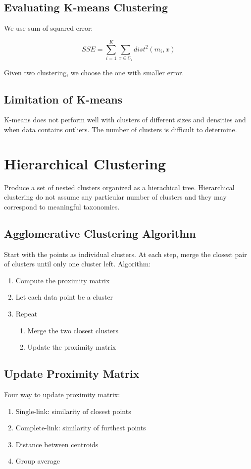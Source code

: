 \begin{multicols*}{2}
\subsection{Evaluating K-means Clustering}

\noindent We use sum of squared error:

$$SSE=\sum_{i=1}^K \sum_{x \in C_i} dist^2 (m_i,x)$$

\noindent Given two clustering, we choose the one with smaller error.

\subsection{Limitation of K-means}

K-means does not perform well with clusters of different sizes and densities and when data contains outliers. The number of clusters is difficult to determine. 

\section{Hierarchical Clustering}

\noindent Produce a set of nested clusters organized as a hierachical tree. Hierarchical clustering do not assume any particular number of clusters and they may correspond to meaningful taxonomies. 

\subsection{Agglomerative Clustering Algorithm}

\noindent Start with the points as individual clusters. At each step, merge the closest pair of clusters until only one cluster left. Algorithm:
\begin{enumerate}
    \item Compute the proximity matrix
    \item Let each data point be a cluster
    \item Repeat
    \begin{enumerate}
        \item Merge the two closest clusters
        \item Update the proximity matrix
    \end{enumerate}
\end{enumerate}

\subsection{Update Proximity Matrix}
\noindent Four way to update proximity matrix:
\begin{enumerate}
    \item Single-link: similarity of closest points
    \item Complete-link: similarity of furthest points
    \item Distance between centroids
    \item Group average
\end{enumerate}


\end{multicols*}
